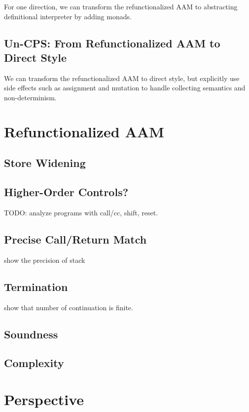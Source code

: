 \documentclass[acmsmall,review,anonymous]{acmart}\settopmatter{printfolios=true,printccs=false,printacmref=false}
\begin{document}
For one direction, we can transform the refunctionalized AAM to abstracting definitional interpreter
by adding monads.

\subsection{Un-CPS: From Refunctionalized AAM to Direct Style}

We can transform the refunctionalized AAM to direct style, but explicitly use 
side effects such as assignment and mutation to handle collecting semantics and non-determinism.

\section{Refunctionalized AAM}

\subsection{Store Widening}

\subsection{Higher-Order Controls?}

TODO: analyze programs with call/cc, shift, reset.

\subsection{Precise Call/Return Match}

show the precision of stack

\subsection{Termination}

show that number of continuation is finite.

\subsection{Soundness}

\subsection{Complexity}

\section{Perspective}
\end{document}
